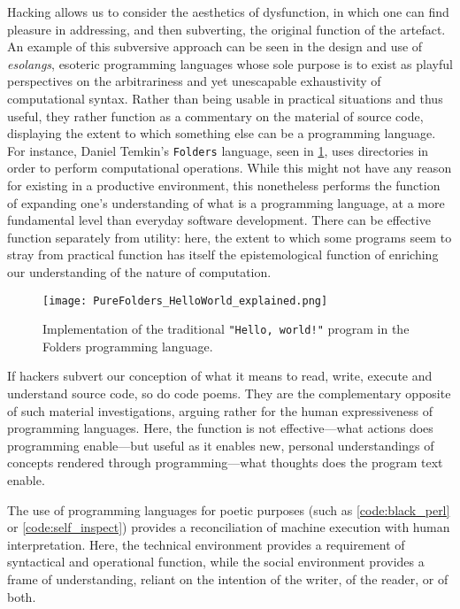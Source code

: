 Hacking allows us to consider the aesthetics of dysfunction, in which one can find pleasure in addressing, and then subverting, the original function of the artefact. An example of this subversive approach can be seen in the design and use of \emph{esolangs}, esoteric programming languages whose sole purpose is to exist as playful perspectives on the arbitrariness and yet unescapable exhaustivity of computational syntax. Rather than being usable in practical situations and thus useful, they rather function as a commentary on the material of source code, displaying the extent to which something else can be a programming language. For instance, Daniel Temkin's \lstinline{Folders} language, seen in \ref{graphic:folders}, uses directories in order to perform computational operations. While this might not have any reason for existing in a productive environment, this nonetheless performs the function of expanding one's understanding of what is a programming language, at a more fundamental level than everyday software development. There can be effective function separately from utility: here, the extent to which some programs seem to stray from practical function has itself the epistemological function of enriching our understanding of the nature of computation.

\begin{figure}
  \texttt{[image: PureFolders\_HelloWorld\_explained.png]}
  \caption{Implementation of the traditional \lstinline{"Hello, world!"} program in the Folders programming language. \citep{temkin_daniel_2015}}
  \label{graphic:folders}
\end{figure}

If hackers subvert our conception of what it means to read, write, execute and understand source code, so do code poems. They are the complementary opposite of such material investigations, arguing rather for the human expressiveness of programming languages. Here, the function is not effective—what actions does programming enable—but useful as it enables new, personal understandings of concepts rendered through programming—what thoughts does the program text enable.

The use of programming languages for poetic purposes (such as \ref{code:black_perl} or \ref{code:self_inspect}) provides a reconciliation of machine execution with human interpretation. Here, the technical environment provides a requirement of syntactical and operational function, while the social environment provides a frame of understanding, reliant on the intention of the writer, of the reader, or of both.

